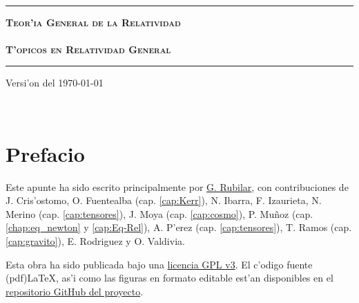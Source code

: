 \documentclass[letterpaper,11pt]{report}
\begin{document}
\sffamily

\thispagestyle{empty}
\begin{center}

\

\vspace{6.5cm}

\rule{15cm}{0.1cm}

\vspace{1.5cm}

{\huge \textsc{\textbf{Teor'ia General de la Relatividad \\ \ \\ T'opicos en Relatividad General}}}

\vspace{1.5cm}

\rule{15cm}{0.1cm}

\vspace{1.5cm}

Versi'on del \today

\end{center}


\newpage
\thispagestyle{empty}
\ \\
\newpage
\setcounter{page}{1}

\pagestyle{plain}
\chapter*{Prefacio}
\bigskip
\bigskip
\bigskip
\bigskip
\bigskip
\bigskip



Este apunte ha sido escrito principalmente por \href{https://twitter.com/gfrubi}{G. Rubilar}, con contribuciones de J. Cris'ostomo, O. Fuentealba (cap. \ref{cap:Kerr}), N. Ibarra, F. Izaurieta, N. Merino (cap. \ref{cap:tensores}), J. Moya (cap. \ref{cap:cosmo}), P. Mu\~noz (cap. \ref{chap:eq_newton} y \ref{cap:Eq-Rel}),  A. P'erez (cap. \ref{cap:tensores}), T. Ramos (cap. \ref{cap:gravito}), E. Rodriguez y O. Valdivia.


\bigskip
\bigskip
\bigskip
\bigskip
\bigskip
\bigskip



Esta obra ha sido publicada bajo una \href{https://github.com/gfrubi/RG/blob/master/LICENSE}{licencia GPL v3}. El c'odigo fuente (pdf)\LaTeX, as'i como las figuras en formato editable est'an disponibles en el \href{https://github.com/gfrubi/RG}{repositorio GitHub del proyecto}.


\bigskip
\bigskip
\bigskip
\end{document}
